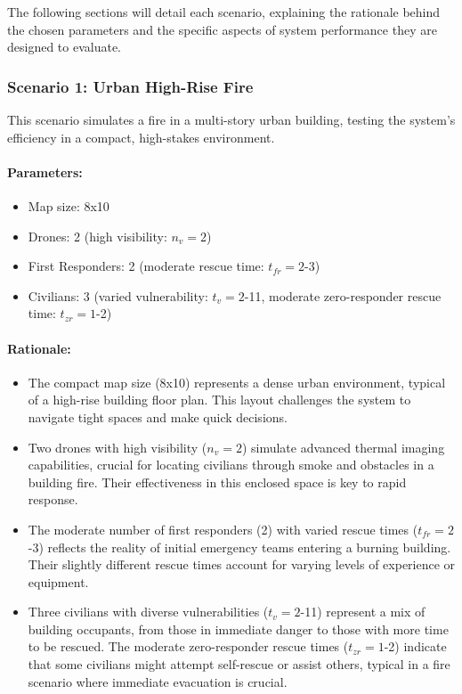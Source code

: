 The following sections will detail each scenario, explaining the rationale behind the chosen parameters and the specific aspects of system performance they are designed to evaluate.

\subsubsection{Scenario 1: Urban High-Rise Fire}

This scenario simulates a fire in a multi-story urban building, testing the system's efficiency in a compact, high-stakes environment.

\paragraph{Parameters:}
\begin{itemize}
	\item Map size: 8x10
	\item Drones: 2 (high visibility: $n_v = 2$)
	\item First Responders: 2 (moderate rescue time: $t_{fr} = 2$-3)
	\item Civilians: 3 (varied vulnerability: $t_v = 2$-11, moderate zero-responder rescue time: $t_{zr} = 1$-2)
\end{itemize}

\paragraph{Rationale:}
\begin{itemize}
	\item The compact map size (8x10) represents a dense urban environment, typical of a high-rise building floor plan. This layout challenges the system to navigate tight spaces and make quick decisions.
	\item Two drones with high visibility ($n_v = 2$) simulate advanced thermal imaging capabilities, crucial for locating civilians through smoke and obstacles in a building fire. Their effectiveness in this enclosed space is key to rapid response.
	\item The moderate number of first responders (2) with varied rescue times ($t_{fr} = 2$-3) reflects the reality of initial emergency teams entering a burning building. Their slightly different rescue times account for varying levels of experience or equipment.
	\item Three civilians with diverse vulnerabilities ($t_v = 2$-11) represent a mix of building occupants, from those in immediate danger to those with more time to be rescued. The moderate zero-responder rescue times ($t_{zr} = 1$-2) indicate that some civilians might attempt self-rescue or assist others, typical in a fire scenario where immediate evacuation is crucial.
\end{itemize}

